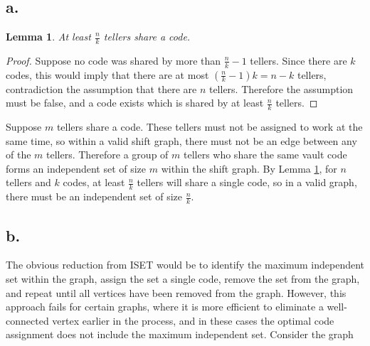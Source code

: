 \documentclass[11pt]{article}
\newtheorem{lem}{Lemma}
\begin{document}
\section{}
\subsection*{a.}
\begin{lem} 
    \label{thm:min-same}  
    At least $\frac{n}{k}$ tellers share a code.

\end{lem}
\begin{proof}
    Suppose no code was shared by more than $\frac{n}{k} - 1$ tellers. Since there are $k$ codes, this would imply that there are at most $(\frac{n}{k} - 1)k = n - k$ tellers, contradiction the assumption that there are $n$ tellers. Therefore the assumption must be false, and a code exists which is shared by at least $\frac{n}{k}$ tellers.
\end{proof}

Suppose $m$ tellers share a code. These tellers must not be assigned to work at the same time, so within a valid shift graph, there must not be an edge between any of the $m$ tellers. Therefore a group of $m$ tellers who share the same vault code forms an independent set of size $m$ within the shift graph. By Lemma \ref{thm:min-same}, for $n$ tellers and $k$ codes, at least $\frac{n}{k}$ tellers will share a single code, so in a valid graph, there must be an independent set of size $\frac{n}{k}$.

\subsection*{b.}
The obvious reduction from ISET would be to identify the maximum independent set within the graph, assign the set a single code, remove the set from the graph, and repeat until all vertices have been removed from the graph. 
 However, this approach fails for certain graphs, where it is more efficient to eliminate a well-connected vertex earlier in the process, and in these cases the optimal code assignment does not include the maximum independent set. Consider the graph 
 \begin{figure}[H]
    \centering
 \end{figure}
\end{document}
